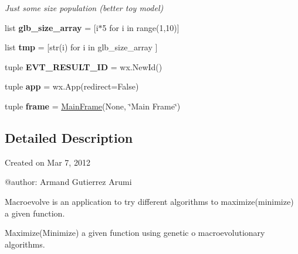 \begin{DoxyCompactItemize}
\begin{DoxyCompactList}\small\item\em Just some size population (better toy model) \end{DoxyCompactList}\item 
\hypertarget{namespacesrc_1_1macroevolve_a004b632242cd5ef5bb01589231a67b39}{
list {\bfseries glb\_\-size\_\-array} = \mbox{[}i$\ast$5 for i in range(1,10)\mbox{]}}
\label{namespacesrc_1_1macroevolve_a004b632242cd5ef5bb01589231a67b39}

\item 
\hypertarget{namespacesrc_1_1macroevolve_ad96ca52d51beaf92b350bcad45299aad}{
list {\bfseries tmp} = \mbox{[}str(i) for i in glb\_\-size\_\-array \mbox{]}}
\label{namespacesrc_1_1macroevolve_ad96ca52d51beaf92b350bcad45299aad}

\item 
\hypertarget{namespacesrc_1_1macroevolve_aa740552afa4a6768c627cc8f01ead222}{
tuple {\bfseries EVT\_\-RESULT\_\-ID} = wx.NewId()}
\label{namespacesrc_1_1macroevolve_aa740552afa4a6768c627cc8f01ead222}

\item 
\hypertarget{namespacesrc_1_1macroevolve_aa3d606e885e9f2a70b9cc0f39f368e37}{
tuple {\bfseries app} = wx.App(redirect=False)}
\label{namespacesrc_1_1macroevolve_aa3d606e885e9f2a70b9cc0f39f368e37}

\item 
\hypertarget{namespacesrc_1_1macroevolve_a74a69df82d743055750295216690a27d}{
tuple {\bfseries frame} = \hyperlink{classsrc_1_1macroevolve_1_1MainFrame}{MainFrame}(None, \char`\"{}Main Frame\char`\"{})}
\label{namespacesrc_1_1macroevolve_a74a69df82d743055750295216690a27d}

\end{DoxyCompactItemize}


\subsection{Detailed Description}
\begin{DoxyVerb}
Created on Mar 7, 2012

@author: Armand Gutierrez Arumi


Macroevolve is an application to try different algorithms to maximize(minimize) 
a given function.

Maximize(Minimize) a given function using genetic o macroevolutionary algorithms.

\end{DoxyVerb}
 

